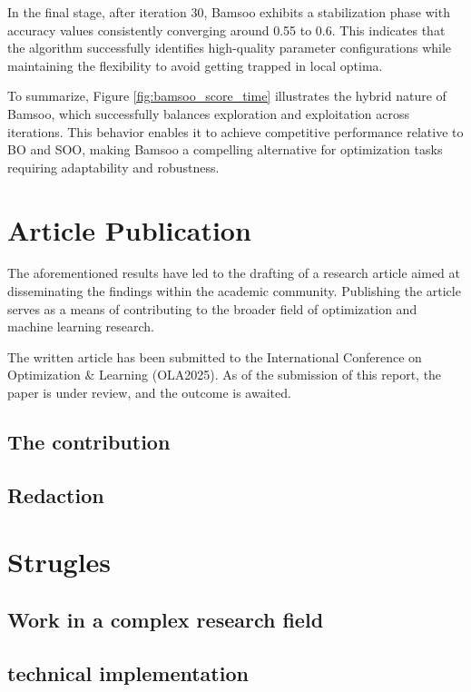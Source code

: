 In the final stage, after iteration 30, Bamsoo exhibits a stabilization phase with accuracy values consistently converging around 0.55 to 0.6. This indicates that the algorithm successfully identifies high-quality parameter configurations while maintaining the flexibility to avoid getting trapped in local optima.

To summarize, Figure \ref{fig:bamsoo_score_time} illustrates the hybrid nature of Bamsoo, which successfully balances exploration and exploitation across iterations. This behavior enables it to achieve competitive performance relative to BO and SOO, making Bamsoo a compelling alternative for optimization tasks requiring adaptability and robustness.


\section{Article Publication}
\label{sec:article}
The aforementioned results have led to the drafting of a research article aimed at disseminating the findings within the academic community. Publishing the article serves as a means of contributing to the broader field of optimization and machine learning research.

The written article has been submitted to the International Conference on Optimization \& Learning (OLA2025). As of the submission of this report, the paper is under review, and the outcome is awaited.

\subsection{The contribution}
\label{sec:contribution}

\subsection{Redaction}
\label{sec:redaction}


\section{Strugles}
\label{sec:strugles}

\subsection{Work in a complex research field}
\label{sec:complex_field}

\subsection{technical implementation}
\label{sec:tech_impl}
